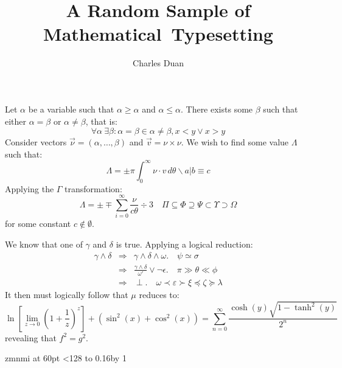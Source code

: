\documentclass[12pt]{article}
\title{A Random Sample of Mathematical~Typesetting}
\author{Charles Duan}
\begin{document}
\maketitle

Let $\alpha$ be a variable such that $\alpha\ge\alpha$ and $\alpha\le\alpha$.
There exists some $\beta$ such that either $\alpha=\beta$ or $\alpha\ne\beta$,
that is:
\[
\forall\alpha\:\exists\beta: \alpha=\beta\in\alpha\ne\beta, x<y\vee x>y
\]
Consider vectors $\vec\nu=(\alpha,\ldots,\beta)$ and $\vec v=\nu\times\nu$. We
wish to find some value $\Lambda$ such that:
\[
\Lambda = \pm \pi \int_{0}^{\infty} \nu\cdot v\,d\theta\backslash a|b\equiv c
\]
Applying the $\Gamma$ transformation:
\[
\Lambda = \pm\mp\sum_{i=0}^{\infty}\frac{\nu}{c\theta}\div3\quad
\Pi\subseteq\Phi\supseteq\Psi\subset\Upsilon\supset\Omega
\]
for some constant $c\not\in\emptyset$.

We know that one of $\gamma$ and $\delta$ is true. Applying a logical reduction:
\begin{eqnarray*}
\gamma\wedge\delta &\Longrightarrow& \gamma\wedge\delta\wedge\omega.\quad
\psi\simeq\sigma \\
&\Longrightarrow& \frac{\gamma\wedge\delta}{\omega'}\vee\neg\epsilon.\quad
\pi\gg\theta\ll\phi \\
&\Longrightarrow& \perp.\quad \omega\prec\varepsilon\succ\xi\preceq\zeta
\succeq\lambda
\end{eqnarray*}
It then must logically follow that $\mu$ reduces to:
\[
\ln\left[\lim_{z\rightarrow0}\left(1+\frac{1}{z}\right)^z\right]
+ \left(\sin^2(x) + \cos^2(x)\right)
= \sum_{n=0}^\infty \frac{\cosh(y)\sqrt{1-\tanh^2(y)}}{2^n}
\]
revealing that $f^2=g^2$.

\clearpage

\begingroup
\newcount\testcount {}
\font\myfont zmnmi at 60pt
\noindent
\loop\ifnum\testcount<128 \hbox to 0.16\textwidth{\the\testcount: \myfont\char\testcount\hfil}\hfil\advance\testcount by 1\repeat
\endgroup
\end{document}
